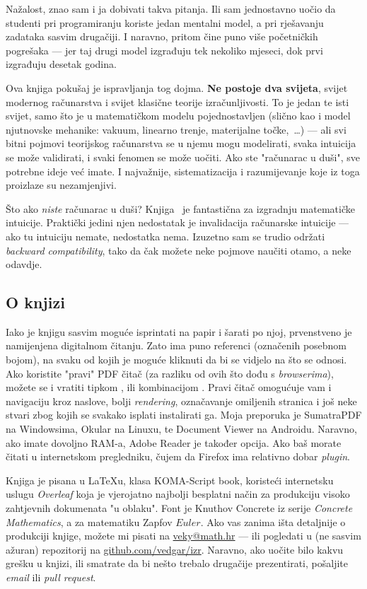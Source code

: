 Nažalost, znao sam i ja dobivati takva pitanja. Ili sam jednostavno uočio da studenti pri programiranju koriste jedan mentalni model, a pri rješavanju zadataka sasvim drugačiji. I naravno, pritom čine puno više početničkih pogrešaka --- jer taj drugi model izgrađuju tek nekoliko mjeseci, dok prvi izgrađuju desetak godina.

Ova knjiga pokušaj je ispravljanja tog dojma. \textbf{Ne postoje dva svijeta}, svijet modernog računarstva i svijet klasične teorije izračunljivosti. To je jedan te isti svijet, samo što je u matematičkom modelu pojednostavljen (slično kao i model njutnovske mehanike: vakuum, linearno trenje, materijalne točke,~\ldots) --- ali svi bitni pojmovi teorijskog računarstva se u njemu mogu modelirati, svaka intuicija se može validirati, i svaki fenomen se može uočiti. Ako ste "računarac u duši", sve potrebne ideje već imate. I najvažnije, sistematizacija i razumijevanje koje iz toga proizlaze su nezamjenjivi.

Što ako \emph{niste} računarac u duši? Knjiga~\cite{skr:Vuk} je fantastična za izgradnju matematičke intuicije. Praktički jedini njen nedostatak je invalidacija računarske intuicije --- ako tu intuiciju nemate, nedostatka nema. Izuzetno sam se trudio održati \emph{backward compatibility}, tako da čak možete neke pojmove naučiti otamo, a neke odavdje.

\subsection{O knjizi}

Iako je knjigu sasvim moguće isprintati na papir i šarati po njoj, prvenstveno je namijenjena digitalnom čitanju. Zato ima puno referenci (označenih posebnom bojom), na svaku od kojih je moguće kliknuti da bi se vidjelo na što se odnosi. Ako koristite "pravi" PDF čitač (za razliku od ovih što dođu s \emph{browserima}), možete se i vratiti tipkom \keys{\!$\Mapsfrom$}, ili kombinacijom . Pravi čitač omogućuje vam i navigaciju kroz naslove, bolji \emph{rendering}, označavanje omiljenih stranica i još neke stvari zbog kojih se svakako isplati instalirati ga. Moja preporuka je \textsf{SumatraPDF} na Windowsima, \textsf{Okular} na Linuxu, te \textsf{Document Viewer} na Androidu. Naravno, ako imate dovoljno RAM-a, \textsf{Adobe Reader} je također opcija. Ako baš morate čitati u internetskom pregledniku, čujem da \textsf{Firefox} ima relativno dobar \emph{plugin}.

Knjiga je pisana u \textsf{\LaTeX{}}u, klasa \textsf{KOMA-Script book}, koristeći internetsku uslugu \emph{Overleaf} koja je vjerojatno najbolji besplatni način za produkciju visoko zahtjevnih dokumenata "u oblaku". Font je Knuthov Concrete iz serije \emph{Concrete Mathematics}, a za matematiku Zapfov \AmS{} $Euler$. Ako vas zanima išta detaljnije o produkciji knjige, možete mi pisati na \href{mailto:veky@math.hr}{veky@math.hr} --- ili pogledati u (ne sasvim ažuran) repozitorij na \href{https://github.com/vedgar/izr}{github.com/vedgar/izr}. Naravno, ako uočite bilo kakvu grešku u knjizi, ili smatrate da bi nešto trebalo drugačije prezentirati, pošaljite \emph{email} ili \emph{pull request}.

